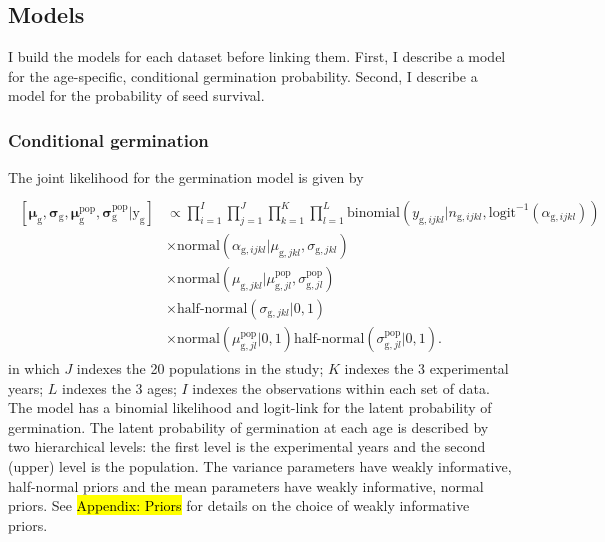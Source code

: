 \documentclass[12pt, oneside, titlepage]{article}   	%
\begin{document}
\subsection{Models}

I build the models for each dataset before linking them. First, I describe a model for the age-specific, conditional germination probability. Second, I describe a model for the probability of seed survival.

\subsubsection{Conditional germination}

The joint likelihood for the germination model is given by 
%
\begin{align}
  \begin{split}
  \\ [ \bm{\mu}_\mathrm{g} , \bm{\sigma}_\mathrm{g} , \bm{\mu}_\mathrm{g}^\mathrm{pop}, \bm{\sigma}_\mathrm{g}^\mathrm{pop} |  \bm{\mathrm{y}}_\mathrm{g}  ] &  \propto \prod_{i=1}^{I} \prod_{j=1}^{J} \prod_{k=1}^{K} \prod_{l=1}^{L} 
   \mathrm{binomial} ( y_{\mathrm{g},ijkl} | n_{\mathrm{g},ijkl}, \mathrm{logit}^{-1}(\alpha_{\mathrm{g},ijkl}) ) 
   \\ & \times \mathrm{normal} ( \alpha_{\mathrm{g},ijkl}  | \mu_{\mathrm{g},jkl}, \sigma{_{\mathrm{g},jkl} })
  \\ & \times \mathrm{normal} ( \mu_{\mathrm{g},jkl}  | \mu^\mathrm{pop}_{\mathrm{g},jl}, \sigma^\mathrm{pop}_{\mathrm{g},jl} )
  \\ & \times \textrm{half-normal} ( \sigma_{\mathrm{g},jkl} | 0,1)
  \\ & \times \mathrm{normal} ( \mu^\mathrm{pop}_{\mathrm{g},jl} | 0 , 1 ) \textrm{half-normal} ( \sigma^\mathrm{pop}_{\mathrm{g},jl} | 0,1).
  \end{split}
\end{align}
% 
in which $J$ indexes the 20 populations in the study; $K$ indexes the 3 experimental years; $L$ indexes the 3 ages; $I$ indexes the observations within each set of data. The model has a binomial likelihood and logit-link for the latent probability of germination. The latent probability of germination at each age is described by two hierarchical levels: the first level is the experimental years and the second (upper) level is the population. The variance parameters have weakly informative, half-normal priors and the mean parameters have weakly informative, normal priors. See \hl{Appendix: Priors} for details on the choice of weakly informative priors. 
\end{document}
